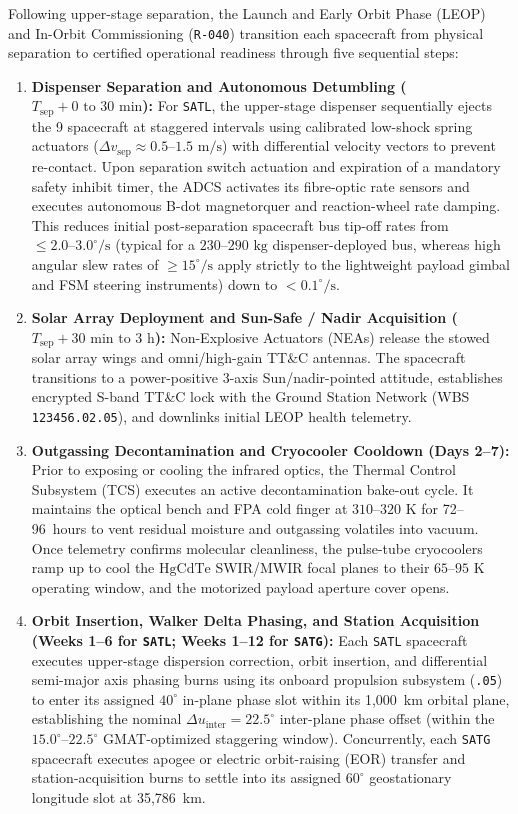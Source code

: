 \documentclass[11pt,a4paper]{article}
\providecommand{\abbr}[1]{#1}
\begin{document}
Following upper-stage separation, the Launch and Early Orbit Phase (\abbr{LEOP}) and In-Orbit Commissioning (\texttt{R-040}) transition each spacecraft from physical separation to certified operational readiness through five sequential steps:
\begin{enumerate}
    \item \textbf{Dispenser Separation and Autonomous Detumbling ($T_{\text{sep}} + 0\text{ to }30\text{ min}$):} For \texttt{SATL}, the upper-stage dispenser sequentially ejects the 9 spacecraft at staggered intervals using calibrated low-shock spring actuators ($\Delta v_{\text{sep}} \approx 0.5\text{--}1.5\text{ m/s}$) with differential velocity vectors to prevent re-contact. Upon separation switch actuation and expiration of a mandatory safety inhibit timer, the \abbr{ADCS} activates its fibre-optic rate sensors and executes autonomous B-dot magnetorquer and reaction-wheel rate damping. This reduces initial post-separation spacecraft bus tip-off rates from $\le 2.0\text{--}3.0^\circ/\text{s}$ (typical for a $230\text{--}290\text{ kg}$ dispenser-deployed bus, whereas high angular slew rates of $\ge 15^\circ/\text{s}$ apply strictly to the lightweight payload gimbal and \abbr{FSM} steering instruments) down to $< 0.1^\circ/\text{s}$.
    \item \textbf{Solar Array Deployment and Sun-Safe / Nadir Acquisition ($T_{\text{sep}} + 30\text{ min to }3\text{ h}$):} Non-Explosive Actuators (\abbr{NEA}s) release the stowed solar array wings and omni/high-gain \abbr{TT\&C} antennas. The spacecraft transitions to a power-positive 3-axis Sun/nadir-pointed attitude, establishes encrypted S-band \abbr{TT\&C} lock with the Ground Station Network (\abbr{WBS} \texttt{123456.02.05}), and downlinks initial \abbr{LEOP} health telemetry.
    \item \textbf{Outgassing Decontamination and Cryocooler Cooldown (Days 2--7):} Prior to exposing or cooling the infrared optics, the Thermal Control Subsystem (\abbr{TCS}) executes an active decontamination bake-out cycle. It maintains the optical bench and \abbr{FPA} cold finger at $310\text{--}320\text{ K}$ for 72--96~hours to vent residual moisture and outgassing volatiles into vacuum. Once telemetry confirms molecular cleanliness, the pulse-tube cryocoolers ramp up to cool the $\mathrm{HgCdTe}$ \abbr{SWIR}/\abbr{MWIR} focal planes to their $65\text{--}95\text{ K}$ operating window, and the motorized payload aperture cover opens.
    \item \textbf{Orbit Insertion, Walker Delta Phasing, and Station Acquisition (Weeks 1--6 for \texttt{SATL}; Weeks 1--12 for \texttt{SATG}):} Each \texttt{SATL} spacecraft executes upper-stage dispersion correction, orbit insertion, and differential semi-major axis phasing burns using its onboard propulsion subsystem (\texttt{.05}) to enter its assigned $40^\circ$ in-plane phase slot within its 1,000~km orbital plane, establishing the nominal $\Delta u_{\text{inter}} = 22.5^\circ$ inter-plane phase offset (within the $15.0^\circ\text{--}22.5^\circ$ GMAT-optimized staggering window). Concurrently, each \texttt{SATG} spacecraft executes apogee or electric orbit-raising (\abbr{EOR}) transfer and station-acquisition burns to settle into its assigned $60^\circ$ geostationary longitude slot at 35,786~km.

\end{enumerate}
\end{document}
